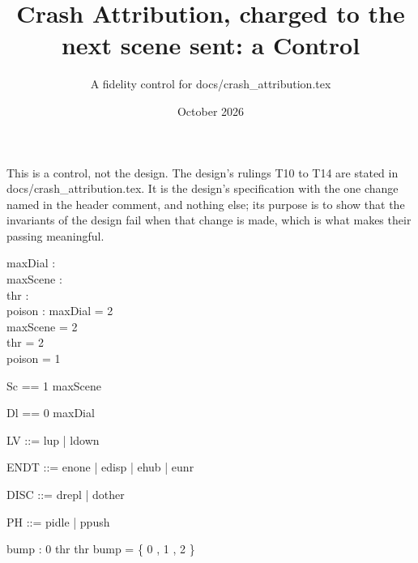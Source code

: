 \documentclass[a4paper,10pt,fleqn]{article}
\begin{document}
\title{Crash Attribution, charged to the next scene sent: a Control}
\author{A fidelity control for docs/crash\_attribution.tex}
\date{October 2026}
\maketitle

This is a control, not the design.  The design's rulings T10 to T14 are stated in docs/crash_attribution.tex.  It is the design's
specification with the one change named in the header comment, and nothing
else; its purpose is to show that the invariants of the design fail when
that change is made, which is what makes their passing meaningful.

\begin{axdef}
  maxDial : \nat \\
  maxScene : \nat \\
  thr : \nat \\
  poison : \nat
\where
  maxDial = 2 \\
  maxScene = 2 \\
  thr = 2 \\
  poison = 1
\end{axdef}

\begin{zed}
  Sc == 1 \upto maxScene
\end{zed}

\begin{zed}
  Dl == 0 \upto maxDial
\end{zed}

\begin{zed}
  LV ::= lup | ldown
\end{zed}

\begin{zed}
  ENDT ::= enone | edisp | ehub | eunr
\end{zed}

\begin{zed}
  DISC ::= drepl | dother
\end{zed}

\begin{zed}
  PH ::= pidle | ppush
\end{zed}

\begin{axdef}
  bump : 0 \upto thr  \upto thr
\where
  bump = \{ 0 , 1 , 2  \}
\end{axdef}
\end{document}
